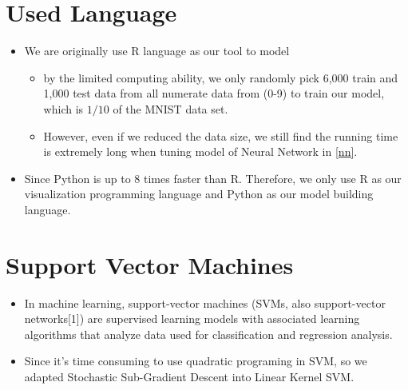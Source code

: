 \documentclass[8pt]{beamer}
\begin{document}







\section{Used Language}
\begin{frame}[allowframebreaks]{\secname}
	\begin{itemize}
  \item We are originally use R language as our tool to model \begin{itemize}
  \item by the limited computing ability, we only randomly pick 6,000 train and 1,000 test data from all numerate data from (0-9) to train our model, which is $1/10$ of the MNIST data set. 
  \item However, even if we reduced the data size, we still find the running time is extremely long when tuning model of Neural Network in \ref{nn}. 
\end{itemize}

  \item Since Python is up to 8 times faster than R. Therefore, we only use R as our visualization programming language and Python as our model building language.
\end{itemize}

\end{frame}




\section{Support Vector Machines}
\begin{frame}[allowframebreaks]{\secname}
	\begin{itemize}
  \item In machine learning, support-vector machines (SVMs, also support-vector networks[1]) are supervised learning models with associated learning algorithms that analyze data used for classification and regression analysis.
  \item Since it's time consuming to use quadratic programing in SVM, so we adapted Stochastic Sub-Gradient Descent into Linear Kernel SVM.
\end{itemize}

\end{frame}
\end{document}
